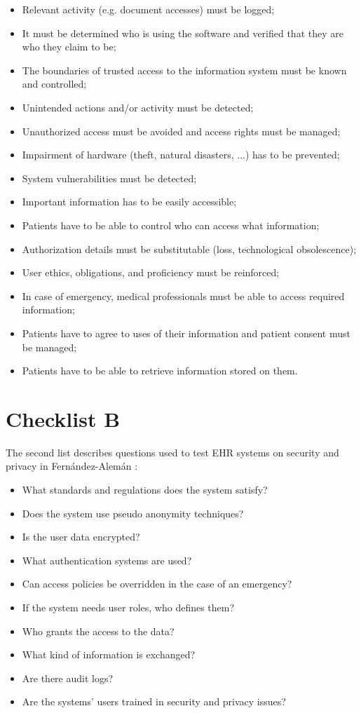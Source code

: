 \begin{itemize}
	\item Relevant activity (e.g. document accesses) must be logged;
	\item It must be determined who is using the software and verified that they are who they claim to be;
	\item The boundaries of trusted access to the information system must be known and controlled;
	\item Unintended actions and/or activity must be detected;
	\item Unauthorized access must be avoided and access rights must be managed;
	\item Impairment of hardware (theft, natural disasters, ...) has to be prevented;
	\item System vulnerabilities must be detected;
	\item Important information has to be easily accessible;
	\item Patients have to be able to control who can access what information;
	\item Authorization details must be substitutable (loss, technological obsolescence);
	\item User ethics, obligations, and proficiency must be reinforced;
	\item In case of emergency, medical professionals must be able to access required information;
	\item Patients have to agree to uses of their information and patient consent must be managed;
	\item Patients have to be able to retrieve information stored on them.
\end{itemize}

\section{Checklist B}
\label{security-checklists-b}

The second list describes questions used to test EHR systems on security and privacy in Fernández-Alemán \cite{s8FernandezAleman2013}:
\begin{itemize}
	\item What standards and regulations does the system satisfy?
	\item Does the system use pseudo anonymity techniques?
	\item Is the user data encrypted? 
	\item What authentication systems are used? 
	\item Can access policies be overridden in the case of an emergency? 
	\item If the system needs user roles, who defines them? 
	\item Who grants the access to the data? 
	\item What kind of information is exchanged? 
	\item Are there audit logs?
	\item Are the systems' users trained in security and privacy issues? 
\end{itemize}
